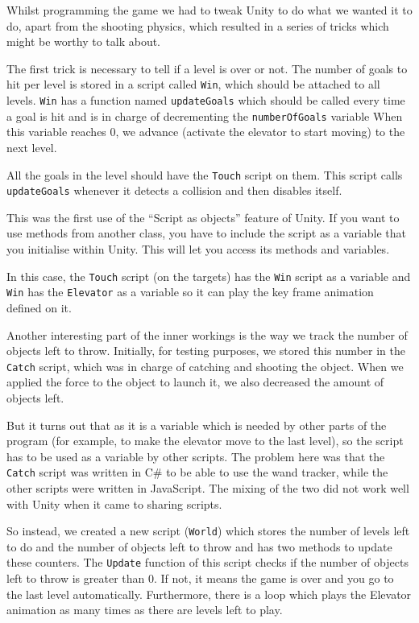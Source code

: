 \documentclass[a4paper]{article}
\begin{document}
Whilst programming the game we had to tweak Unity to do what we wanted it to do,
apart from the shooting physics, which resulted in a series of tricks which might
be worthy to talk about.

The first trick is necessary to tell if a level is over or not. The number of goals to
hit per level is stored in a script called \verb!Win!, which should be attached to
all levels. \verb!Win! has a function named \verb!updateGoals! which should be called
every time a goal is hit and is in charge of decrementing the \verb!numberOfGoals! variable
When this variable reaches 0, we advance (activate the elevator to start moving) to the
next level.

All the goals in the level should have the \verb!Touch! script on them. This script calls
\verb!updateGoals! whenever it detects a collision and then disables itself.

This was the first use of the ``Script as objects'' feature of Unity. If you want
to use methods from another class, you have to include the script as a variable
that you initialise within Unity. This will let you access its methods and variables.

In this case, the \verb!Touch! script (on the targets) has the \verb!Win! script as a
variable and \verb!Win! has the \verb!Elevator! as a variable so it can play the key
frame animation defined on it.

Another interesting part of the inner workings is the way we track the number of
objects left to throw. Initially, for testing purposes, we stored this number in the
\verb!Catch! script, which was in charge of catching and shooting the object. When
we applied the force to the object to launch it, we also decreased the amount of
objects left.

But it turns out that as it is a variable which is needed by other parts of the
program (for example, to make the elevator move to the last level), so the script
has to be used as a variable by other scripts. The problem here was that the
\verb!Catch! script was written in C\# to be able to use the wand tracker, while
the other scripts were written in JavaScript. The mixing of the two did not work
well with Unity when it came to sharing scripts.

So instead, we created a new script (\verb!World!) which stores the number of levels
left to do and the number of objects left to throw and has two methods to update
these counters. The \verb!Update! function of this script checks if the number of
objects left to throw is greater than 0. If not, it means the game is over and you
go to the last level automatically. Furthermore, there is a loop which plays the
Elevator animation as many times as there are levels left to play.
\end{document}
